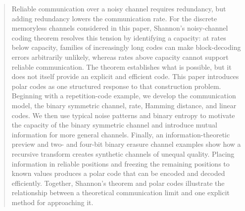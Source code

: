 \begin{abstract}
Reliable communication over a noisy channel requires redundancy, but adding redundancy lowers the communication rate. For the discrete memoryless channels considered in this paper, Shannon's noisy-channel coding theorem resolves this tension by identifying a capacity: at rates below capacity, families of increasingly long codes can make block-decoding errors arbitrarily unlikely, whereas rates above capacity cannot support reliable communication. The theorem establishes what is possible, but it does not itself provide an explicit and efficient code. This paper introduces polar codes as one structured response to that construction problem. Beginning with a repetition-code example, we develop the communication model, the binary symmetric channel, rate, Hamming distance, and linear codes. We then use typical noise patterns and binary entropy to motivate the capacity of the binary symmetric channel and introduce mutual information for more general channels. Finally, an information-theoretic preview and two- and four-bit binary erasure channel examples show how a recursive transform creates synthetic channels of unequal quality. Placing information in reliable positions and freezing the remaining positions to known values produces a polar code that can be encoded and decoded efficiently. Together, Shannon's theorem and polar codes illustrate the relationship between a theoretical communication limit and one explicit method for approaching it.
\end{abstract}
